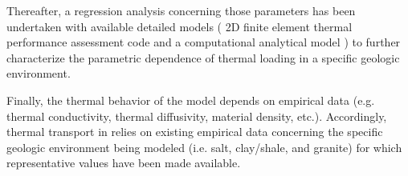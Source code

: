

%

Thereafter, a regression analysis concerning those parameters has been 
undertaken with available detailed models ( 2D finite element thermal 
performance assessment code \cite{huff_thermal_2012} and a computational 
analytical model \cite{greenberg_application_2011}) to further characterize the 
parametric dependence of thermal loading in a specific geologic environment.  


Finally, the thermal behavior of the \Cyder model depends on empirical data 
(e.g. thermal conductivity, thermal diffusivity, material density, etc.). 
Accordingly, thermal transport in \Cyder relies on existing empirical data 
concerning the specific geologic environment being modeled (i.e. salt, 
clay/shale, and granite) for which representative values have been made 
available.



